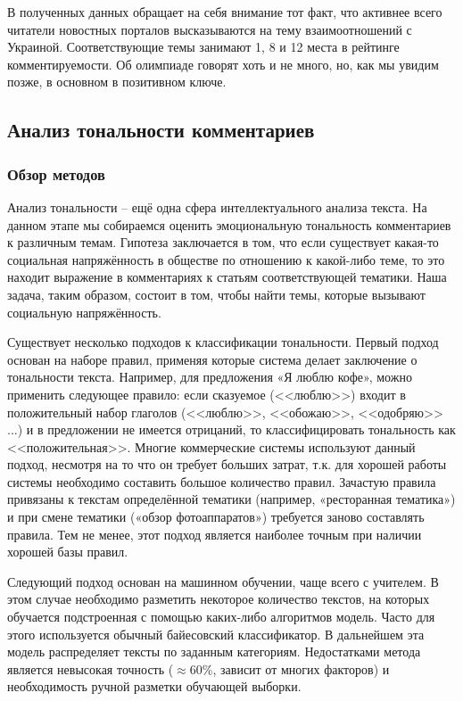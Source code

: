 В полученных данных обращает на себя внимание тот факт, что активнее всего читатели новостных порталов высказываются на тему взаимоотношений с Украиной. Соответствующие темы занимают 1, 8 и 12 места в рейтинге комментируемости. Об олимпиаде говорят хоть и не много, но, как мы увидим позже, в основном в позитивном ключе.

\subsection{Анализ тональности комментариев}
\subsubsection{Обзор методов}
Анализ тональности -- ещё одна сфера интеллектуального анализа текста. На данном этапе мы собираемся оценить эмоциональную тональность комментариев к различным темам. Гипотеза заключается в том, что если существует какая-то социальная напряжённость в обществе по отношению к какой-либо теме, то это находит выражение в комментариях к статьям соответствующей тематики. Наша задача, таким образом, состоит в том, чтобы найти темы, которые вызывают социальную напряжённость.

Существует несколько подходов к классификации тональности. Первый подход основан на наборе правил, применяя которые система делает заключение о тональности текста. Например, для предложения «Я люблю кофе», можно применить следующее правило: если сказуемое (<<люблю>>) входит в положительный набор глаголов (<<люблю>>, <<обожаю>>, <<одобряю>> ...) и в предложении не имеется отрицаний, то классифицировать тональность как <<положительная>>. Многие коммерческие системы используют данный подход, несмотря на то что он требует больших затрат, т.к. для хорошей работы системы необходимо составить большое количество правил. Зачастую правила привязаны к текстам определённой тематики (например, «ресторанная тематика») и при смене тематики («обзор фотоаппаратов») требуется заново составлять правила. Тем не менее, этот подход является наиболее точным при наличии хорошей базы правил.

Следующий подход основан на машинном обучении, чаще всего с учителем. В этом случае необходимо разметить некоторое количество текстов, на которых обучается подстроенная с помощью каких-либо алгоритмов модель. Часто для этого используется обычный байесовский классификатор. В дальнейшем эта модель распределяет тексты по заданным категориям. Недостатками метода является невысокая точность ($\approx60$\%, зависит от многих факторов) и необходимость ручной разметки обучающей выборки.

